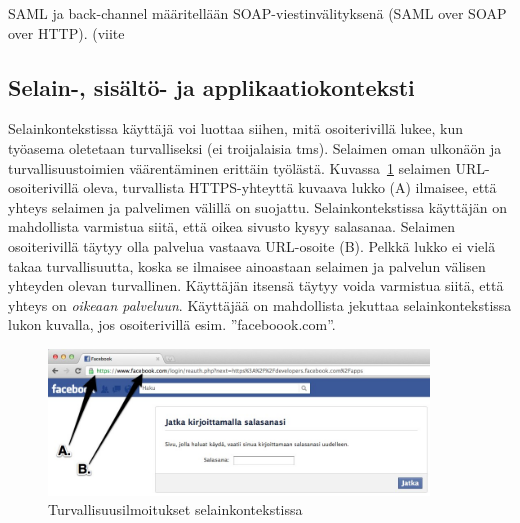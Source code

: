 \documentclass[finnish,gradu]{tktltiki}
\begin{document}
  SAML ja back-channel määritellään SOAP-viestinvälityksenä (SAML over SOAP over HTTP).
  (viite %



  \subsection{Selain-, sisältö- ja applikaatiokonteksti} %
  \label{sub:selainkonteksti_vs_applikaatiokonteksti}

  Selainkontekstissa käyttäjä voi luottaa siihen, mitä osoiterivillä lukee, kun työasema oletetaan turvalliseksi (ei troijalaisia tms). Selaimen oman ulkonäön ja turvallisuustoimien väärentäminen erittäin työlästä. Kuvassa~\ref{fig:facebook_reauth_ab} selaimen URL-osoiterivillä oleva, turvallista HTTPS-yhteyttä kuvaava lukko (A) ilmaisee, että yhteys selaimen ja palvelimen välillä on suojattu. Selainkontekstissa käyttäjän on mahdollista varmistua siitä, että oikea sivusto kysyy salasanaa. Selaimen osoiterivillä täytyy olla palvelua vastaava URL-osoite (B). Pelkkä lukko ei vielä takaa turvallisuutta, koska se ilmaisee ainoastaan selaimen ja palvelun välisen yhteyden olevan turvallinen. Käyttäjän itsensä täytyy voida varmistua siitä, että yhteys on \emph{oikeaan palveluun}. Käyttäjää on mahdollista jekuttaa selainkontekstissa lukon kuvalla, jos osoiterivillä esim. ''faceboook.com''.

  \begin{figure}
    \centering
    \includegraphics[width=0.9\textwidth]{images/Facebook_reauth_ab.jpg}
    \caption{Turvallisuusilmoitukset selainkontekstissa}
    \label{fig:facebook_reauth_ab}
  \end{figure}
\end{document}
